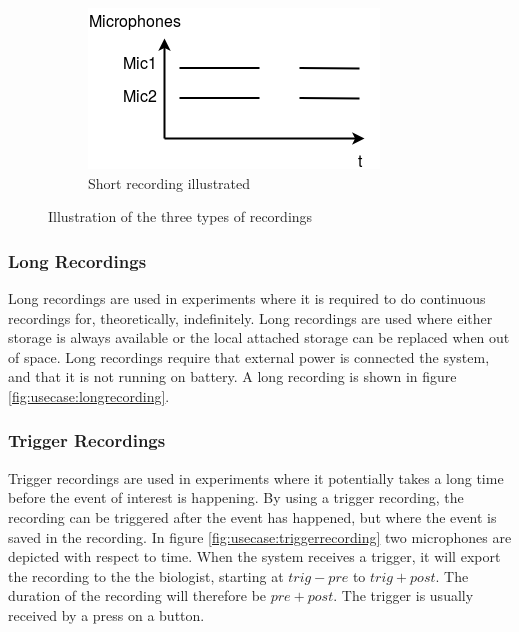 \begin{figure}[H]
    \begin{subfigure}[b]{0.3\textwidth}
        \includegraphics[width=\textwidth]{figures/recording_short.png}
        \caption{Short recording illustrated}
        \label{fig:usecase:shortrecording}
    \end{subfigure}
    \caption{Illustration of the three types of recordings}\label{fig:usecase:recordingtypes}
\end{figure}
\subsubsection{Long Recordings}\label{sec:usecase:longrecording}
Long recordings are used in experiments where it is required to do continuous recordings for, theoretically, indefinitely. Long recordings are used where either storage is always available or the local attached storage can be replaced when out of space. Long recordings require that external power is connected the system, and that it is not running on battery. A long recording is shown in figure \ref{fig:usecase:longrecording}.

\subsubsection{Trigger Recordings}\label{sec:usecase:triggerrecording}
Trigger recordings are used in experiments where it potentially takes a long time before the event of interest is happening. By using a trigger recording, the recording can be triggered after the event has happened, but where the event is saved in the recording. In figure \ref{fig:usecase:triggerrecording} two microphones are depicted with respect to time. When the system receives a trigger, it will export the recording to the the biologist, starting at $trig-pre$ to $trig+post$. The duration of the recording will therefore be $pre+post$. The trigger is usually received by a press on a button.

